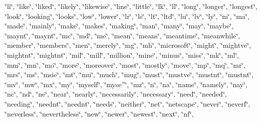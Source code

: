 \char`\"{}li\char`\"{}, \char`\"{}like\char`\"{}, \char`\"{}liked\char`\"{}, \char`\"{}likely\char`\"{}, \char`\"{}likewise\char`\"{}, \char`\"{}line\char`\"{}, \char`\"{}little\char`\"{}, \char`\"{}lk\char`\"{}, \char`\"{}ll\char`\"{}, \char`\"{}long\char`\"{}, \char`\"{}longer\char`\"{}, \char`\"{}longest\char`\"{}, \char`\"{}look\char`\"{}, \char`\"{}looking\char`\"{}, \char`\"{}looks\char`\"{}, \char`\"{}low\char`\"{}, \char`\"{}lower\char`\"{}, \char`\"{}lr\char`\"{}, \char`\"{}ls\char`\"{}, \char`\"{}lt\char`\"{}, \char`\"{}ltd\char`\"{}, \char`\"{}lu\char`\"{}, \char`\"{}lv\char`\"{}, \char`\"{}ly\char`\"{}, \char`\"{}m\char`\"{}, \char`\"{}ma\char`\"{}, \char`\"{}made\char`\"{}, \char`\"{}mainly\char`\"{}, \char`\"{}make\char`\"{}, \char`\"{}makes\char`\"{}, \char`\"{}making\char`\"{}, \char`\"{}man\char`\"{}, \char`\"{}many\char`\"{}, \char`\"{}may\char`\"{}, \char`\"{}maybe\char`\"{}, \char`\"{}mayn\textquotesingle{}t\char`\"{}, \char`\"{}maynt\char`\"{}, \char`\"{}mc\char`\"{}, \char`\"{}md\char`\"{}, \char`\"{}me\char`\"{}, \char`\"{}mean\char`\"{}, \char`\"{}means\char`\"{}, \char`\"{}meantime\char`\"{}, \char`\"{}meanwhile\char`\"{}, \char`\"{}member\char`\"{}, \char`\"{}members\char`\"{}, \char`\"{}men\char`\"{}, \char`\"{}merely\char`\"{}, \char`\"{}mg\char`\"{}, \char`\"{}mh\char`\"{}, \char`\"{}microsoft\char`\"{}, \char`\"{}might\char`\"{}, \char`\"{}might\textquotesingle{}ve\char`\"{}, \char`\"{}mightn\textquotesingle{}t\char`\"{}, \char`\"{}mightnt\char`\"{}, \char`\"{}mil\char`\"{}, \char`\"{}mill\char`\"{}, \char`\"{}million\char`\"{}, \char`\"{}mine\char`\"{}, \char`\"{}minus\char`\"{}, \char`\"{}miss\char`\"{}, \char`\"{}mk\char`\"{}, \char`\"{}ml\char`\"{}, \char`\"{}mm\char`\"{}, \char`\"{}mn\char`\"{}, \char`\"{}mo\char`\"{}, \char`\"{}more\char`\"{}, \char`\"{}moreover\char`\"{}, \char`\"{}most\char`\"{}, \char`\"{}mostly\char`\"{}, \char`\"{}move\char`\"{}, \char`\"{}mp\char`\"{}, \char`\"{}mq\char`\"{}, \char`\"{}mr\char`\"{}, \char`\"{}mrs\char`\"{}, \char`\"{}ms\char`\"{}, \char`\"{}msie\char`\"{}, \char`\"{}mt\char`\"{}, \char`\"{}mu\char`\"{}, \char`\"{}much\char`\"{}, \char`\"{}mug\char`\"{}, \char`\"{}must\char`\"{}, \char`\"{}must\textquotesingle{}ve\char`\"{}, \char`\"{}mustn\textquotesingle{}t\char`\"{}, \char`\"{}mustnt\char`\"{}, \char`\"{}mv\char`\"{}, \char`\"{}mw\char`\"{}, \char`\"{}mx\char`\"{}, \char`\"{}my\char`\"{}, \char`\"{}myself\char`\"{}, \char`\"{}myse”\char`\"{}, \char`\"{}mz\char`\"{}, \char`\"{}n\char`\"{}, \char`\"{}na\char`\"{}, \char`\"{}name\char`\"{}, \char`\"{}namely\char`\"{}, \char`\"{}nay\char`\"{}, \char`\"{}nc\char`\"{}, \char`\"{}nd\char`\"{}, \char`\"{}ne\char`\"{}, \char`\"{}near\char`\"{}, \char`\"{}nearly\char`\"{}, \char`\"{}necessarily\char`\"{}, \char`\"{}necessary\char`\"{}, \char`\"{}need\char`\"{}, \char`\"{}needed\char`\"{}, \char`\"{}needing\char`\"{}, \char`\"{}needn\textquotesingle{}t\char`\"{}, \char`\"{}neednt\char`\"{}, \char`\"{}needs\char`\"{}, \char`\"{}neither\char`\"{}, \char`\"{}net\char`\"{}, \char`\"{}netscape\char`\"{}, \char`\"{}never\char`\"{}, \char`\"{}neverf\char`\"{}, \char`\"{}neverless\char`\"{}, \char`\"{}nevertheless\char`\"{}, \char`\"{}new\char`\"{}, \char`\"{}newer\char`\"{}, \char`\"{}newest\char`\"{}, \char`\"{}next\char`\"{}, \char`\"{}nf\char`\"{}, 